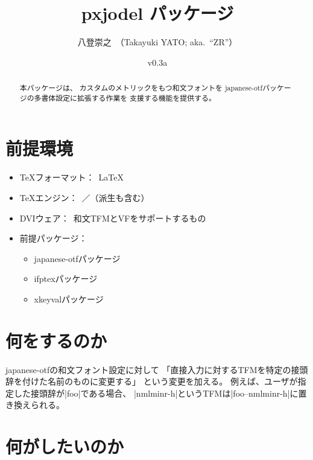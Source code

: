 \documentclass[uplatex,dvipdfmx,a4paper]{jsarticle}
\newcommand{\PkgVersion}{0.3a}
\newcommand{\PkgDate}{2025/09/15}
\newcommand{\Pkg}[1]{\textsf{#1}}
\newcommand{\Means}{：\ }
\begin{document}
\title{\Pkg{pxjodel} パッケージ}
\author{八登崇之\ （Takayuki YATO; aka.~``ZR''）}
\date{v\PkgVersion\quad[\PkgDate]}
\maketitle

\begin{abstract}
本パッケージは、
カスタムのメトリックをもつ和文フォントを
\Pkg{japanese-otf}パッケージの多書体設定に拡張する作業を
支援する機能を提供する。
\end{abstract}


\section{前提環境}
\label{sec:Requirement}

\begin{itemize}
\item {\TeX}フォーマット\Means {\LaTeX}
\item {\TeX}エンジン\Means {\pTeX}／{\upTeX}（派生も含む）
\item DVIウェア\Means 和文TFMとVFをサポートするもの
\item 前提パッケージ\Means
  \begin{itemize}
  \item \Pkg{japanese-otf}パッケージ
  \item \Pkg{ifptex}パッケージ
  \item \Pkg{xkeyval}パッケージ
  \end{itemize}
\end{itemize}

\section{何をするのか}
\label{sec:Basic}

\Pkg{japanese-otf}の和文フォント設定に対して
「直接入力に対するTFMを特定の接頭辞を付けた名前のものに変更する」
という変更を加える。
例えば、ユーザが指定した接頭辞が|foo|である場合、
|nmlminr-h|というTFMは|foo--nmlminr-h|に置き換えられる。

\section{何がしたいのか}
\label{sec:Objective}
\end{document}
